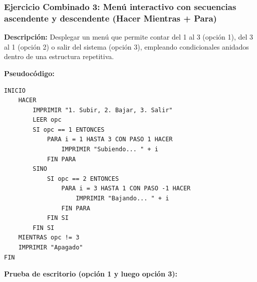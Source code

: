 \subsubsection{Ejercicio Combinado 3: Menú interactivo con secuencias
ascendente y descendente (Hacer Mientras +
Para)}\label{ejercicio-combinado-3-menuxfa-interactivo-con-secuencias-ascendente-y-descendente-hacer-mientras-para}

\textbf{Descripción:} Desplegar un menú que permite contar del 1 al 3
(opción 1), del 3 al 1 (opción 2) o salir del sistema (opción 3),
empleando condicionales anidados dentro de una estructura repetitiva.

\textbf{Pseudocódigo:}

\begin{verbatim}
INICIO
    HACER
        IMPRIMIR "1. Subir, 2. Bajar, 3. Salir"
        LEER opc
        SI opc == 1 ENTONCES
            PARA i = 1 HASTA 3 CON PASO 1 HACER
                IMPRIMIR "Subiendo... " + i
            FIN PARA
        SINO
            SI opc == 2 ENTONCES
                PARA i = 3 HASTA 1 CON PASO -1 HACER
                    IMPRIMIR "Bajando... " + i
                FIN PARA
            FIN SI
        FIN SI
    MIENTRAS opc != 3
    IMPRIMIR "Apagado"
FIN
\end{verbatim}

\textbf{Prueba de escritorio (opción 1 y luego opción 3):}

